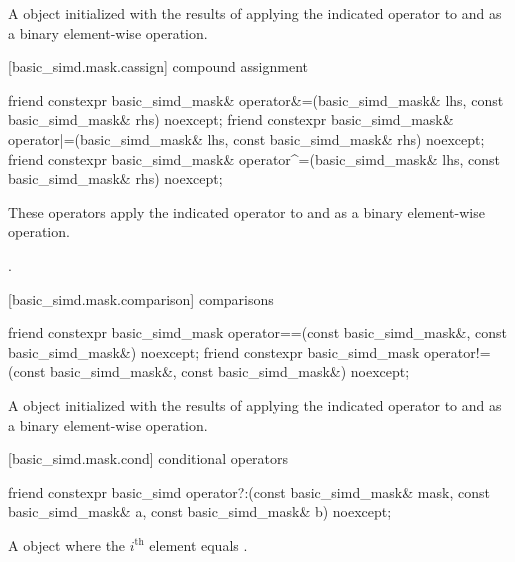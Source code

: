 \begin{itemdescr}
  \pnum\returns
  A  object initialized with the results of applying the indicated operator to  and  as a binary element-wise operation.
\end{itemdescr}

[basic_simd.mask.cassign]{ compound assignment}

\begin{itemdecl}
friend constexpr basic_simd_mask& operator&=(basic_simd_mask& lhs, const basic_simd_mask& rhs) noexcept;
friend constexpr basic_simd_mask& operator|=(basic_simd_mask& lhs, const basic_simd_mask& rhs) noexcept;
friend constexpr basic_simd_mask& operator^=(basic_simd_mask& lhs, const basic_simd_mask& rhs) noexcept;
\end{itemdecl}

\begin{itemdescr}
  \pnum\effects
  These operators apply the indicated operator to  and  as a binary element-wise operation.

  \pnum\returns
  .
\end{itemdescr}

[basic_simd.mask.comparison]{ comparisons}

\begin{itemdecl}
friend constexpr basic_simd_mask operator==(const basic_simd_mask&, const basic_simd_mask&) noexcept;
friend constexpr basic_simd_mask operator!=(const basic_simd_mask&, const basic_simd_mask&) noexcept;
\end{itemdecl}

\begin{itemdescr}
  \pnum\returns
  A  object initialized with the results of applying the indicated operator to  and  as a binary element-wise operation.
\end{itemdescr}

[basic_simd.mask.cond]{ conditional operators}

\begin{itemdecl}
friend constexpr basic_simd operator?:(const basic_simd_mask& mask, const basic_simd_mask& a, const basic_simd_mask& b) noexcept;
\end{itemdecl}

\begin{itemdescr}
  \pnum\returns
  A  object where the $i^\text{th}$ element equals  \foralli.
\end{itemdescr}

